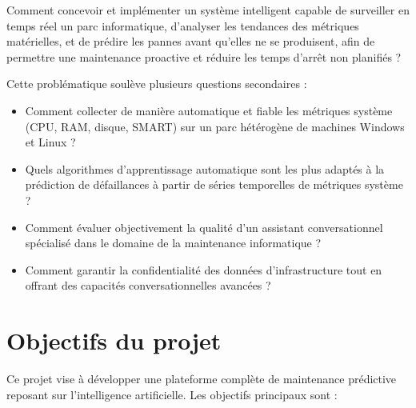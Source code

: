 \begin{infobox}
Comment concevoir et implémenter un système intelligent capable de surveiller en temps réel
un parc informatique, d'analyser les tendances des métriques matérielles, et de prédire les
pannes avant qu'elles ne se produisent, afin de permettre une maintenance proactive et
réduire les temps d'arrêt non planifiés ?
\end{infobox}

Cette problématique soulève plusieurs questions secondaires :
\begin{itemize}[leftmargin=1.5cm]
  \item Comment collecter de manière automatique et fiable les métriques système (CPU, RAM,
        disque, SMART) sur un parc hétérogène de machines Windows et Linux ?
  \item Quels algorithmes d'apprentissage automatique sont les plus adaptés à la prédiction
        de défaillances à partir de séries temporelles de métriques système ?
  \item Comment évaluer objectivement la qualité d'un assistant conversationnel spécialisé
        dans le domaine de la maintenance informatique ?
  \item Comment garantir la confidentialité des données d'infrastructure tout en offrant
        des capacités conversationnelles avancées ?
\end{itemize}

\section*{Objectifs du projet}

Ce projet vise à développer une plateforme complète de maintenance prédictive reposant sur
l'intelligence artificielle. Les objectifs principaux sont :

